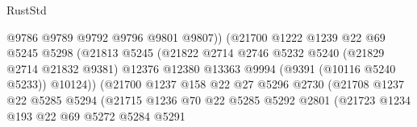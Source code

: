 \begin{lexlean}{RustStd}
\begin{coremodule}
                                        @9786
                                        @9789
                                        @9792
                                        @9796
                                        @9801
                                        @9807))
                                    (@21700
                                      @1222
                                      @1239
                                      @22
                                      @69
                                      @5245
                                      @5298
                                      (@21813
                                        @5245
                                        (@21822
                                          @2714
                                          @2746
                                          @5232
                                          @5240
                                          (@21829 @2714 @21832 @9381)
                                          @12376
                                          @12380
                                          @13363
                                          @9994
                                          (@9391 (@10116 @5240 @5233))
                                          @10124))
                                      (@21700
                                        @1237
                                        @158
                                        @22
                                        @27
                                        @5296
                                        @2730
                                        (@21708
                                          @1237
                                          @22
                                          @5285
                                          @5294
                                          (@21715
                                            @1236
                                            @70
                                            @22
                                            @5285
                                            @5292
                                            @2801
                                            (@21723
                                              @1234
                                              @193
                                              @22
                                              @69
                                              @5272
                                              @5284
                                              @5291

\end{coremodule}
\end{lexlean}
